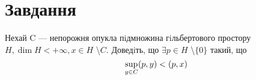 
\chapter{Завдання \theHchapter}


\begin{tcolorbox}[title=Завдання]
    
    Нехай C — непорожня опукла пiдмножина гiльбертового 
    простору $ H, \dim H < + \infty, x \in H $ \textbackslash $C $.
    Доведiть, що $ \exists p \in H$ \textbackslash $\{0\} $ такий, що
    $$ \displaystyle\sup_{y \in C} (p, y) < (p, x) $$

    
\end{tcolorbox}

